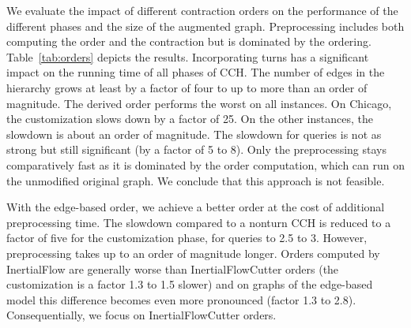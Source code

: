 \documentclass[a4paper, english, cleveref]{lipics-v2021}
\begin{document}

We evaluate the impact of different contraction orders on the performance of the different phases and the size of the augmented graph.
Preprocessing includes both computing the order and the contraction but is dominated by the ordering.
Table~\ref{tab:orders} depicts the results.
Incorporating turns has a significant impact on the running time of all phases of CCH.
The number of edges in the hierarchy grows at least by a factor of four to up to more than an order of magnitude.
The derived order performs the worst on all instances.
On Chicago, the customization slows down by a factor of 25.
On the other instances, the slowdown is about an order of magnitude.
The slowdown for queries is not as strong but still significant (by a factor of 5 to 8).
Only the preprocessing stays comparatively fast as it is dominated by the order computation, which can run on the unmodified original graph.
We conclude that this approach is not feasible.

With the edge-based order, we achieve a better order at the cost of additional preprocessing time.
The slowdown compared to a nonturn CCH is reduced to a factor of five for the customization phase, for queries to 2.5 to 3.
However, preprocessing takes up to an order of magnitude longer.
Orders computed by InertialFlow are generally worse than InertialFlowCutter orders (the customization is a factor 1.3 to 1.5 slower) and on graphs of the edge-based model this difference becomes even more pronounced (factor 1.3 to 2.8).
Consequentially, we focus on InertialFlowCutter orders.
\end{document}
